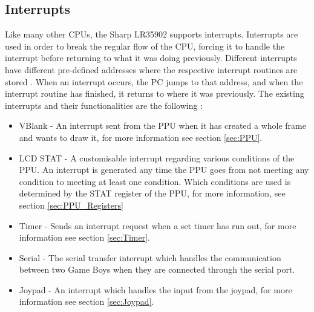 \subsection{Interrupts}
\label{sub}

Like many other CPUs, the Sharp LR35902 supports interrupts. Interrupts are used in order to break the regular flow of the CPU, forcing it to handle the interrupt before returning to what it was doing previously.
Different interrupts have different pre-defined addresses where the respective interrupt routines are stored \cite{pandocsinterrupts}. When an interrupt occurs, the PC jumps to that address, and when the interrupt routine has finished, it returns to where it was previously. The existing interrupts and their functionalities are the following \cite{pandocsinterrupts}:
\\
\begin{itemize}
    \item VBlank - An interrupt sent from the PPU when it has created a whole frame and wants to draw it, for more information see section \ref{sec:PPU}.
    \item LCD STAT - A customisable interrupt regarding various conditions of the PPU. An interrupt is generated any time the PPU goes from not meeting any condition to meeting at least one condition. Which conditions are used is determined by the STAT register of the PPU, for more information, see section \ref{sec:PPU_Registers}
    \item Timer - Sends an interrupt request when a set timer has run out, for more information see  section \ref{sec:Timer}.
    \item Serial - The serial transfer interrupt which handles the communication between two Game Boys when they are connected through the serial port.
    \item Joypad - An interrupt which handles the input from the joypad, for more information see section \ref{sec:Joypad}.
    \\
\end{itemize}

